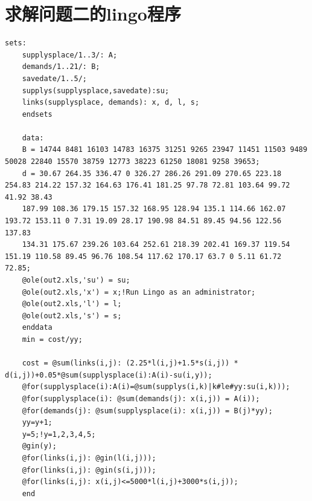 \documentclass{article}
\begin{document}
	\section{求解问题二的lingo程序}
	\begin{lstlisting}[language=lingo]
	sets:
	supplysplace/1..3/: A;
	demands/1..21/: B;
	savedate/1..5/;
	supplys(supplysplace,savedate):su;
	links(supplysplace, demands): x, d, l, s;
	endsets
	
	data:
	B = 14744 8481 16103 14783 16375 31251 9265 23947 11451 11503 9489 50028 22840 15570 38759 12773 38223 61250 18081 9258 39653;	
	d = 30.67 264.35 336.47 0 326.27 286.26 291.09 270.65 223.18 254.83 214.22 157.32 164.63 176.41 181.25 97.78 72.81 103.64 99.72 41.92 38.43 
	187.99 108.36 179.15 157.32 168.95 128.94 135.1 114.66 162.07 193.72 153.11 0 7.31 19.09 28.17 190.98 84.51 89.45 94.56 122.56 137.83 
	134.31 175.67 239.26 103.64 252.61 218.39 202.41 169.37 119.54 151.19 110.58 89.45 96.76 108.54 117.62 170.17 63.7 0 5.11 61.72 72.85;
	@ole(out2.xls,'su') = su;
	@ole(out2.xls,'x') = x;!Run Lingo as an administrator;
	@ole(out2.xls,'l') = l;
	@ole(out2.xls,'s') = s;
	enddata
	min = cost/yy;
	
	cost = @sum(links(i,j): (2.25*l(i,j)+1.5*s(i,j)) * d(i,j))+0.05*@sum(supplysplace(i):A(i)-su(i,y));
	@for(supplysplace(i):A(i)=@sum(supplys(i,k)|k#le#yy:su(i,k)));
	@for(supplysplace(i): @sum(demands(j): x(i,j)) = A(i));
	@for(demands(j): @sum(supplysplace(i): x(i,j)) = B(j)*yy);
	yy=y+1;
	y=5;!y=1,2,3,4,5;
	@gin(y);
	@for(links(i,j): @gin(l(i,j)));
	@for(links(i,j): @gin(s(i,j)));
	@for(links(i,j): x(i,j)<=5000*l(i,j)+3000*s(i,j));
	end
	\end{lstlisting}
	
	
%	
%	
		
\end{document}
